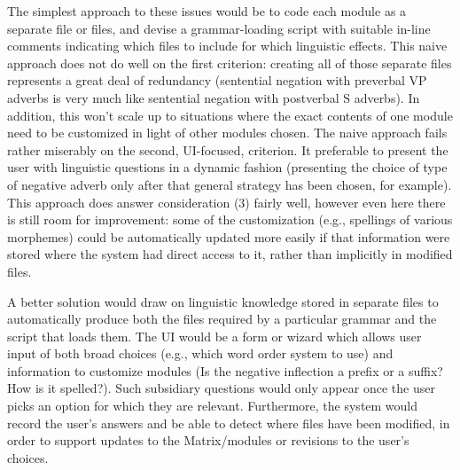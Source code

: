 The simplest approach to these issues would be to code each module as a
separate file or files, and devise a grammar-loading script with
suitable in-line comments indicating which files to include for which
linguistic effects.  This naive approach does not do well on the first
criterion: creating all of those separate files represents a great
deal of redundancy (sentential negation with preverbal VP adverbs is
very much like sentential negation with postverbal S adverbs).
In addition, this won't scale up to
situations where the exact contents of one module need to be
customized in light of other modules chosen.  The naive approach fails
rather miserably on the second, UI-focused, criterion.  It 
preferable to present the user with linguistic questions in a dynamic
fashion (presenting the choice of type of negative adverb only after
that general strategy has been chosen, for example).  This approach
does answer consideration (3) fairly well, however
even here there is still room for improvement:
some of the customization (e.g., spellings of various morphemes) could
be automatically updated more easily if that information were stored
where the system had direct access to it, rather than implicitly in
modified files.

A better solution would draw on linguistic knowledge stored in
separate files to automatically produce both the files required by a
particular grammar and the script that loads them.  The UI 
would be a form or wizard which allows user input of both
broad choices (e.g., which word order system to use) and information
to customize modules (Is the negative inflection a prefix or a suffix?
How is it spelled?).  Such subsidiary questions would only appear once
the user picks an option for which they are relevant. 
Furthermore, the system would record the user's answers 
and be able to detect where files have been modified, in order to
support updates to the Matrix/modules or revisions to the user's choices.

